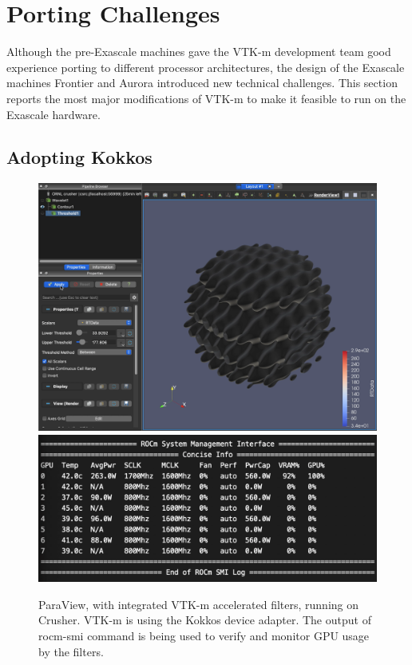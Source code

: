 \section{Porting Challenges}

Although the pre-Exascale machines gave the VTK-m development team good experience porting to different processor architectures, the design of the Exascale machines Frontier and Aurora introduced new technical challenges.
This section reports the most major modifications of VTK-m to make it feasible to run on the Exascale hardware.


\subsection{Adopting Kokkos}


\begin{figure}[htb]
  \includegraphics[width=\linewidth]{figures/paraview-crusher.png}
  \includegraphics[width=\linewidth]{figures/threshold-vtkm-gpu-usage-crusher-small.png}
  \caption{ParaView, with integrated VTK-m accelerated filters, running on Crusher. VTK-m is using the Kokkos device adapter. The output of rocm-smi command is being used to verify and monitor GPU usage by the filters.}
  \label{fig:paraview-crusher}
\end{figure}

